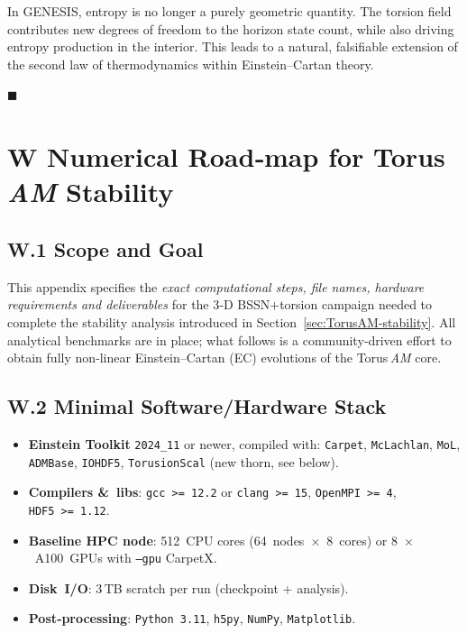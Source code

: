\documentclass{article}
\begin{document}
\begin{tcolorbox}[colback=gray!5, colframe=black!30, title=Why this matters]
In GENESIS, entropy is no longer a purely geometric quantity. The torsion field contributes new degrees of freedom to the horizon state count, while also driving entropy production in the interior. This leads to a natural, falsifiable extension of the second law of thermodynamics within Einstein–Cartan theory.
\end{tcolorbox}

\hfill$\blacksquare$








\section{W  Numerical Road‑map for Torus \textit{AM} Stability}
\label{app:NumRoadmap}

\subsection{W.1  Scope and Goal}
This appendix specifies the \emph{exact computational steps, file names, 
hardware requirements and deliverables} for the 3‑D BSSN$+$torsion 
campaign needed to complete the stability analysis introduced in 
Section~\ref{sec:TorusAM-stability}.  
All analytical benchmarks are in place; what follows is a community‑driven 
effort to obtain fully non‑linear Einstein–Cartan (EC) evolutions of the 
Torus\,\textit{AM} core.

\subsection{W.2  Minimal Software/Hardware Stack}
\begin{itemize}
\item \textbf{Einstein Toolkit} \texttt{2024\_11} or newer, compiled with:
      \texttt{Carpet}, \texttt{McLachlan}, \texttt{MoL}, \texttt{ADMBase},
      \texttt{IOHDF5}, \texttt{TorusionScal} (new thorn, see below).

\item \textbf{Compilers \& libs}: \texttt{gcc >= 12.2} or \texttt{clang >= 15}, 
      \texttt{OpenMPI >= 4}, \texttt{HDF5 >= 1.12}.
      
\item \textbf{Baseline HPC node}: 512 CPU cores (64 nodes $\times$ 8 cores)  
      or 8 $\times$ A100 GPUs with \texttt{--gpu} CarpetX.

\item \textbf{Disk I/O}: 3 TB scratch per run (checkpoint + analysis).

\item \textbf{Post‑processing}: \texttt{Python 3.11}, \texttt{h5py}, 
      \texttt{NumPy}, \texttt{Matplotlib}.
\end{itemize}
\end{document}
